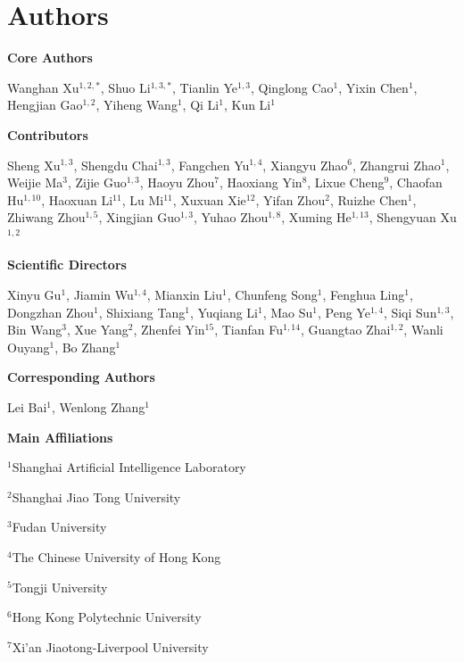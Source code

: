 \renewcommand{\thesection}{\Alph{section}}
\renewcommand{\thesubsection}{\Alph{section}.\arabic{subsection}}
\renewcommand{\thesubsubsection}{\Alph{section}.\arabic{subsection}.\arabic{subsubsection}}

\section{Authors}

\begin{flushleft}

\textbf{Core Authors}

Wanghan Xu$^{1,2,*}$,
Shuo Li$^{1,3,*}$,
Tianlin Ye$^{1,3}$,
Qinglong Cao$^{1}$,
Yixin Chen$^{1}$,
Hengjian Gao$^{1,2}$,
Yiheng Wang$^{1}$,
Qi Li$^{1}$,
Kun Li$^{1}$

\textbf{Contributors}

Sheng Xu$^{1,3}$,
Shengdu Chai$^{1,3}$,
Fangchen Yu$^{1,4}$,
Xiangyu Zhao$^{6}$,
Zhangrui Zhao$^{1}$,
Weijie Ma$^{3}$,
Zijie Guo$^{1,3}$,
Haoyu Zhou$^{7}$,
Haoxiang Yin$^{8}$,
Lixue Cheng$^{9}$,
Chaofan Hu$^{1,10}$,
Haoxuan Li$^{11}$,
Lu Mi$^{11}$,
Xuxuan Xie$^{12}$,
Yifan Zhou$^{2}$,
Ruizhe Chen$^{1}$,
Zhiwang Zhou$^{1,5}$,
Xingjian Guo$^{1,3}$,
Yuhao Zhou$^{1,8}$,
Xuming He$^{1,13}$,
Shengyuan Xu$^{1,2}$

\textbf{Scientific Directors}

Xinyu Gu$^{1}$,
Jiamin Wu$^{1,4}$,
Mianxin Liu$^{1}$,
Chunfeng Song$^{1}$,
Fenghua Ling$^{1}$,
Dongzhan Zhou$^{1}$,
Shixiang Tang$^{1}$,
Yuqiang Li$^{1}$,
Mao Su$^{1}$,
Peng Ye$^{1,4}$,
Siqi Sun$^{1,3}$,
Bin Wang$^{3}$,
Xue Yang$^{2}$,
Zhenfei Yin$^{15}$,
Tianfan Fu$^{1,14}$,
Guangtao Zhai$^{1,2}$,
Wanli Ouyang$^{1}$,
Bo Zhang$^{1}$

\textbf{Corresponding Authors}

Lei Bai$^{1}$,
Wenlong Zhang$^{1}$

\vspace{\baselineskip}

\textbf{Main Affiliations}

$^{1}$Shanghai Artificial Intelligence Laboratory

$^{2}$Shanghai Jiao Tong University

$^{3}$Fudan University

$^{4}$The Chinese University of Hong Kong

$^{5}$Tongji University

$^{6}$Hong Kong Polytechnic University

$^{7}$Xi'an Jiaotong-Liverpool University


\end{flushleft}
